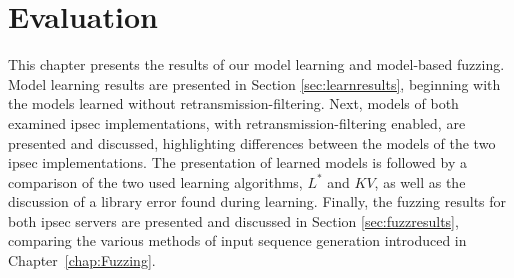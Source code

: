%
%
% 

\chapter{Evaluation} \label{chap:Evaluation}

This chapter presents the results of our model learning and model-based fuzzing. Model learning results are presented in Section \ref{sec:learnresults}, beginning with the models learned without retransmission-filtering. Next, models of both examined \ac{ipsec} implementations, with retransmission-filtering enabled, are presented and discussed, highlighting differences between the models of the two \ac{ipsec} implementations. The presentation of learned models is followed by a comparison of the two used learning algorithms, $L^*$ and $KV$, as well as the discussion of a library error found during learning. Finally, the fuzzing results for both \ac{ipsec} servers are presented and discussed in Section \ref{sec:fuzzresults}, comparing the various methods of input sequence generation introduced in Chapter~\ref{chap:Fuzzing}.

\iffalse
